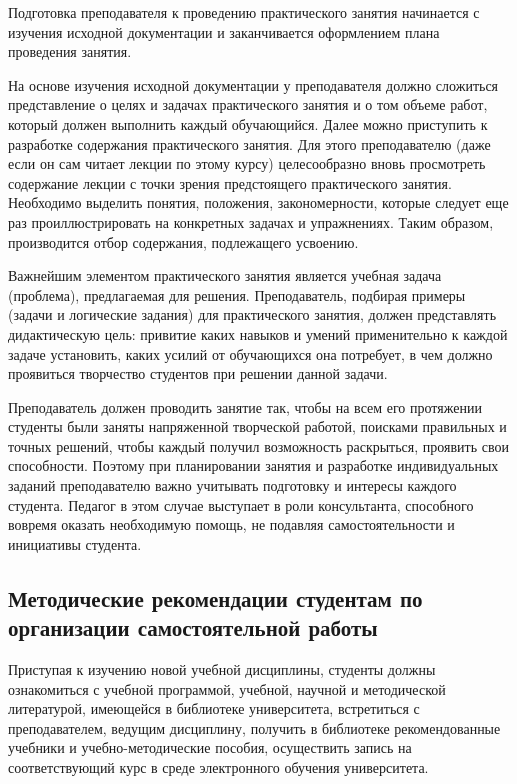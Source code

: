 \documentclass[a4paper, 12pt]{article}
\begin{document}
Подготовка преподавателя к проведению практического занятия начинается с изучения исходной документации и заканчивается оформлением плана проведения занятия.

На основе изучения исходной документации у преподавателя должно сложиться представление о целях и задачах практического занятия и о том объеме работ, который должен выполнить каждый обучающийся. Далее можно приступить к разработке содержания практического занятия. Для этого преподавателю (даже если он сам читает лекции по этому курсу) целесообразно вновь просмотреть содержание лекции с точки зрения предстоящего практического занятия. Необходимо выделить понятия, положения, закономерности, которые следует еще раз проиллюстрировать на конкретных задачах и упражнениях. Таким образом, производится отбор содержания, подлежащего усвоению.

Важнейшим элементом практического занятия является учебная задача (проблема), предлагаемая для решения. Преподаватель, подбирая примеры (задачи и логические задания) для практического занятия, должен представлять дидактическую цель: привитие каких навыков и умений применительно к каждой задаче установить, каких усилий от обучающихся она потребует, в чем должно проявиться творчество студентов при решении данной задачи.

Преподаватель должен проводить занятие так, чтобы на всем его протяжении студенты были заняты напряженной творческой работой, поисками правильных и точных решений, чтобы каждый получил возможность раскрыться, проявить свои способности. Поэтому при планировании занятия и разработке индивидуальных заданий преподавателю важно учитывать подготовку и интересы каждого студента. Педагог в этом случае выступает в роли консультанта,  способного вовремя оказать необходимую помощь, не подавляя самостоятельности и инициативы студента.

\subsection{Методические рекомендации студентам по организации самостоятельной работы}

Приступая к изучению новой учебной дисциплины, студенты должны ознакомиться с учебной программой, учебной, научной и методической литературой, имеющейся в библиотеке университета, встретиться с преподавателем, ведущим дисциплину, получить в библиотеке рекомендованные учебники и учебно-методические пособия, осуществить запись на соответствующий курс в среде электронного обучения университета.
\end{document}
